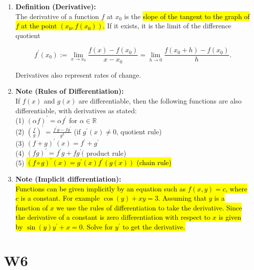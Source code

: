 \documentclass[10pt]{article}
\begin{document}
\begin{enumerate}

\item \textbf{Definition (Derivative):}\\
The derivative of a function $f$ at $x_{0}$ is the \hl{slope of the tangent to the graph of $f$ at the point $\left(x_{0}, f\left(x_{0}\right)\right)$.} If it exists, it is the limit of the difference quotient

$$
f^{\prime}\left(x_{0}\right):=\lim _{x \rightarrow x_{0}} \frac{f(x)-f\left(x_{0}\right)}{x-x_{0}}=\lim _{h \rightarrow 0} \frac{f\left(x_{0}+h\right)-f\left(x_{0}\right)}{h} .
$$

Derivatives also represent rates of change.

\item \textbf{Note (Rules of Differentiation):} \\
If $f(x)$ and $g(x)$ are differentiable, then the following functions are also differentiable, with derivatives as stated:\\
(1) $(\alpha f)^{\prime}=\alpha f^{\prime}$ for $\alpha \in \mathbb{R}$\\
(2) $\left(\frac{f}{g}\right)^{\prime}=\frac{f^{\prime} g-f g^{\prime}}{g^{2}}$ (if $g^{\prime}(x) \neq 0$, quotient rule)\\
(3) $(f+g)^{\prime}(x)=f^{\prime}+g^{\prime}$\\
(4) $(f g)^{\prime}=f^{\prime} g+f g^{\prime}($ product rule)\\
(5) \hl{$(f \circ g)^{\prime}(x)=g^{\prime}(x) f^{\prime}(g(x))$ (chain rule)}\\

\item \textbf{Note (Implicit differentiation):}\\
\hl{Functions can be given implicitly by an equation such as $f(x, y)=c$, where $c$ is a constant. For example $\cos (y)+x y=3$. Assuming that $y$ is a function of $x$ we use the rules of differentiation to take the derivative. Since the derivative of a constant is zero differentiation with respect to $x$ is given by $\sin (y) y^{\prime}+x=0$. Solve for $y^{\prime}$ to get the derivative.}

\end{enumerate}


\newpage

\section{W6}
\end{document}

